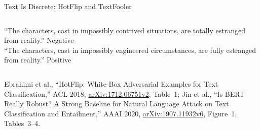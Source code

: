 \begin{frame}{Text Is Discrete: HotFlip and TextFooler}
\begin{columns}[T,onlytextwidth]
      \vspace{0.2em}
      {\scriptsize ``The characters, cast in impossibly contrived situations, are totally estranged from reality.'' Negative\\ ``The characters, cast in impossibly engineered circumstances, are fully estranged from reality.'' Positive\par}
  \end{columns}
  \vspace{0.2em}
  {\scriptsize Ebrahimi et al., ``HotFlip: White-Box Adversarial Examples for Text Classification,'' ACL 2018, \href{https://arxiv.org/abs/1712.06751v2}{arXiv:1712.06751v2}, Table~1; Jin et al., ``Is BERT Really Robust? A Strong Baseline for Natural Language Attack on Text Classification and Entailment,'' AAAI 2020, \href{https://arxiv.org/abs/1907.11932v6}{arXiv:1907.11932v6}, Figure~1, Tables~3--4.\par}
\end{frame}

